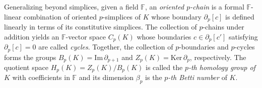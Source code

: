 Generalizing beyond simplices, given a field $\mathbb{F}$, an \emph{oriented $p$-chain} is a formal $\mathbb{F}$-linear combination of oriented $p$-simplices of $K$ whose boundary $\partial_p[c]$ is defined linearly in terms of its constitutive simplices. 
The collection of $p$-chains under addition yields an $\mathbb{F}$-vector space $C_p(K)$ whose boundaries $c \in \partial_p[c']$ satisfying $\partial_p[c] = 0$ are called \emph{cycles}.
 Together, the collection of $p$-boundaries and $p$-cycles forms the groups $B_p(K) = \mathrm{Im}\,\partial_{p+1}$ and $Z_p(K) = \mathrm{Ker}\,\partial_p$, respectively. 
The quotient space $H_p(K) = Z_p(K) / B_{p}(K)$ is 
 called the \emph{$p$-th homology group of $K$} with coefficients in $\mathbb{F}$ and its dimension $\beta_p$ is the \emph{$p$-th Betti number} of $K$.


